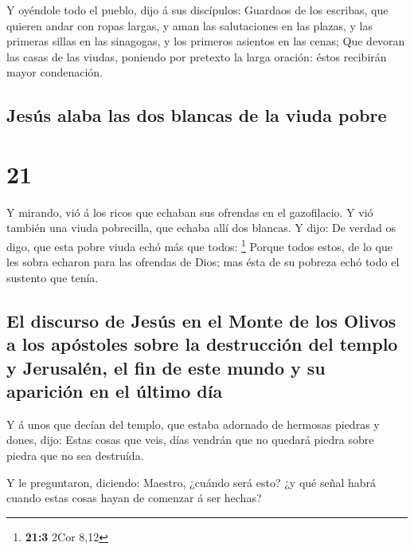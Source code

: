  Y oyéndole todo el pueblo, dijo á sus discípulos:
 Guardaos de los escribas, que quieren andar con ropas
largas, y aman las salutaciones en las plazas, y las primeras sillas en
las sinagogas, y los primeros asientos en las cenas;  Que
devoran las casas de las viudas, poniendo por pretexto la larga oración:
éstos recibirán mayor condenación.

\hypertarget{jesuxfas-alaba-las-dos-blancas-de-la-viuda-pobre}{%
\subsection{Jesús alaba las dos blancas de la viuda
pobre}\label{jesuxfas-alaba-las-dos-blancas-de-la-viuda-pobre}}

\hypertarget{section-20}{%
\section{21}\label{section-20}}

 Y mirando, vió á los ricos que echaban sus ofrendas en el
gazofilacio.  Y vió también una viuda pobrecilla, que echaba
allí dos blancas.  Y dijo: De verdad os digo, que esta pobre
viuda echó más que todos: \footnote{\textbf{21:3} 2Cor 8,12}
 Porque todos estos, de lo que les sobra echaron para las
ofrendas de Dios; mas ésta de su pobreza echó todo el sustento que
tenía.

\hypertarget{el-discurso-de-jesuxfas-en-el-monte-de-los-olivos-a-los-apuxf3stoles-sobre-la-destrucciuxf3n-del-templo-y-jerusaluxe9n-el-fin-de-este-mundo-y-su-apariciuxf3n-en-el-uxfaltimo-duxeda}{%
\subsection{El discurso de Jesús en el Monte de los Olivos a los
apóstoles sobre la destrucción del templo y Jerusalén, el fin de este
mundo y su aparición en el último
día}\label{el-discurso-de-jesuxfas-en-el-monte-de-los-olivos-a-los-apuxf3stoles-sobre-la-destrucciuxf3n-del-templo-y-jerusaluxe9n-el-fin-de-este-mundo-y-su-apariciuxf3n-en-el-uxfaltimo-duxeda}}

 Y á unos que decían del templo, que estaba adornado de
hermosas piedras y dones, dijo:  Estas cosas que veis, días
vendrán que no quedará piedra sobre piedra que no sea destruída.

 Y le preguntaron, diciendo: Maestro, ¿cuándo será esto? ¿y
qué señal habrá cuando estas cosas hayan de comenzar á ser hechas?

